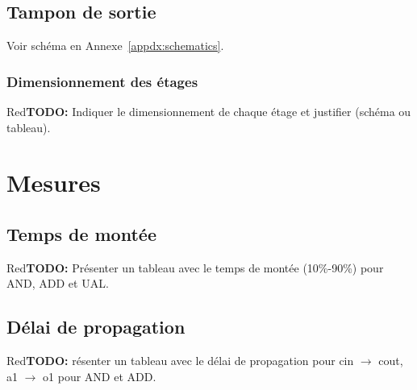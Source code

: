 \documentclass[a11paper]{article}
\newcommand{\todo}[1]{\begin{color}{Red}\textbf{TODO:} #1\end{color}}
\begin{document}
\subsection{Tampon de sortie}
Voir schéma en Annexe~\ref{appdx:schematics}.

\subsubsection{Dimensionnement des étages}
\todo{Indiquer le dimensionnement de chaque étage et justifier (schéma ou tableau).}

\section{Mesures}

\subsection{Temps de montée}
\todo{Présenter un tableau avec le temps de montée (10\%-90\%) pour AND, ADD et UAL.}

\subsection{Délai de propagation}
\todo{résenter un tableau avec le délai de propagation pour cin $\rightarrow$ cout, a1 $\rightarrow$ o1 pour AND et ADD.}


\end{document}

